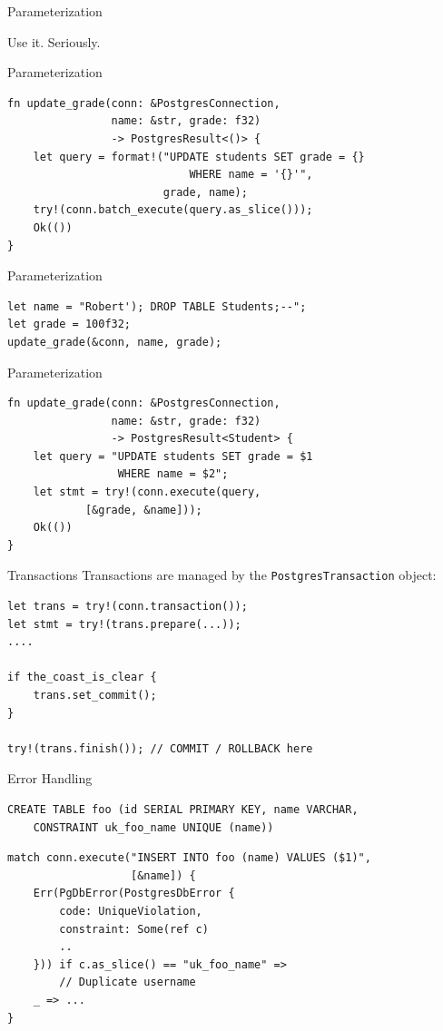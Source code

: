\documentclass{beamer}
\begin{document}
\begin{frame}[fragile]{Parameterization}
    \begin{center}
        Use it. Seriously.
    \end{center}
\end{frame}

\begin{frame}[fragile]{Parameterization}
    \begin{verbatim}
fn update_grade(conn: &PostgresConnection,
                name: &str, grade: f32)
                -> PostgresResult<()> {
    let query = format!("UPDATE students SET grade = {}
                            WHERE name = '{}'",
                        grade, name);
    try!(conn.batch_execute(query.as_slice()));
    Ok(())
}
    \end{verbatim}
\end{frame}

\begin{frame}[fragile]{Parameterization}
    \begin{verbatim}
let name = "Robert'); DROP TABLE Students;--";
let grade = 100f32;
update_grade(&conn, name, grade);
    \end{verbatim}
\end{frame}

\begin{frame}[fragile]{Parameterization}
    \begin{verbatim}
fn update_grade(conn: &PostgresConnection,
                name: &str, grade: f32)
                -> PostgresResult<Student> {
    let query = "UPDATE students SET grade = $1
                 WHERE name = $2";
    let stmt = try!(conn.execute(query,
            [&grade, &name]));
    Ok(())
}
    \end{verbatim}
\end{frame}

\begin{frame}[fragile]{Transactions}
    Transactions are managed by the \verb!PostgresTransaction! object:
    \begin{verbatim}
let trans = try!(conn.transaction());
let stmt = try!(trans.prepare(...));
....

if the_coast_is_clear {
    trans.set_commit();
}

try!(trans.finish()); // COMMIT / ROLLBACK here
    \end{verbatim}
\end{frame}

\begin{frame}[fragile]{Error Handling}
    \begin{verbatim}
CREATE TABLE foo (id SERIAL PRIMARY KEY, name VARCHAR,
    CONSTRAINT uk_foo_name UNIQUE (name))
    \end{verbatim}
    \begin{verbatim}
match conn.execute("INSERT INTO foo (name) VALUES ($1)",
                   [&name]) {
    Err(PgDbError(PostgresDbError {
        code: UniqueViolation,
        constraint: Some(ref c)
        ..
    })) if c.as_slice() == "uk_foo_name" =>
        // Duplicate username
    _ => ...
}
    \end{verbatim}
\end{frame}
\end{document}
